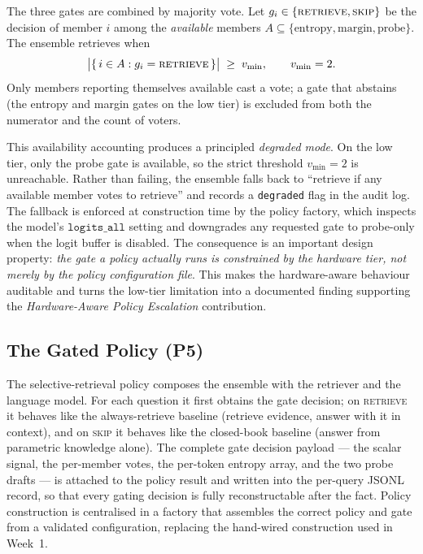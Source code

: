 The three gates are combined by majority vote. Let $g_i \in
\{\textsc{retrieve}, \textsc{skip}\}$ be the decision of member $i$ among the
\emph{available} members $A \subseteq \{\text{entropy}, \text{margin},
\text{probe}\}$. The ensemble retrieves when
\[
  \bigl|\{\, i \in A : g_i = \textsc{retrieve} \,\}\bigr| \;\ge\; v_{\min},
  \qquad v_{\min} = 2 .
\]
Only members reporting themselves available cast a vote; a gate that abstains
(the entropy and margin gates on the low tier) is excluded from both the
numerator and the count of voters.

This availability accounting produces a principled \emph{degraded mode}. On the
low tier, only the probe gate is available, so the strict threshold
$v_{\min}=2$ is unreachable. Rather than failing, the ensemble falls back to
``retrieve if any available member votes to retrieve'' and records a
\texttt{degraded} flag in the audit log. The fallback is enforced at
construction time by the policy factory, which inspects the model's
$\texttt{logits\_all}$ setting and downgrades any requested gate to
probe-only when the logit buffer is disabled. The consequence is an important
design property: \emph{the gate a policy actually runs is constrained by the
hardware tier, not merely by the policy configuration file}. This makes the
hardware-aware behaviour auditable and turns the low-tier limitation into a
documented finding supporting the \emph{Hardware-Aware Policy Escalation}
contribution.

\subsection{The Gated Policy (P5)}
\label{sec:p5-policy}

The selective-retrieval policy composes the ensemble with the retriever and the
language model. For each question it first obtains the gate decision; on
\textsc{retrieve} it behaves like the always-retrieve baseline (retrieve
evidence, answer with it in context), and on \textsc{skip} it behaves like the
closed-book baseline (answer from parametric knowledge alone). The complete
gate decision payload --- the scalar signal, the per-member votes, the
per-token entropy array, and the two probe drafts --- is attached to the policy
result and written into the per-query JSONL record, so that every gating
decision is fully reconstructable after the fact. Policy construction is
centralised in a factory that assembles the correct policy and gate from a
validated configuration, replacing the hand-wired construction used in Week~1.

